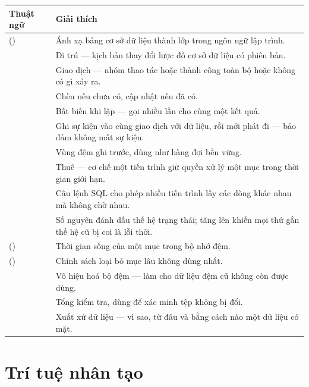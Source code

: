 \begin{longtable}{L{4.2cm} L{9.4cm}}
\toprule
\textbf{Thuật ngữ} & \textbf{Giải thích}\\
\midrule
\endhead
{} () & Ánh xạ bảng cơ sở dữ liệu thành lớp trong ngôn ngữ lập trình.\\
 & Di trú — kịch bản thay đổi lược đồ cơ sở dữ liệu có phiên bản.\\
 & Giao dịch — nhóm thao tác hoặc thành công toàn bộ hoặc không có gì xảy ra.\\
 & Chèn nếu chưa có, cập nhật nếu đã có.\\
 & Bất biến khi lặp — gọi nhiều lần cho cùng một kết quả.\\
 & Ghi sự kiện vào cùng giao dịch với dữ liệu, rồi mới phát đi — bảo đảm không mất sự kiện.\\
 & Vùng đệm ghi trước, dùng như hàng đợi bền vững.\\
 & Thuê — cơ chế một tiến trình giữ quyền xử lý một mục trong thời gian giới hạn.\\
 & Câu lệnh SQL cho phép nhiều tiến trình lấy các dòng khác nhau mà không chờ nhau.\\
 & Số nguyên đánh dấu thế hệ trạng thái; tăng lên khiến mọi thứ gắn thế hệ cũ bị coi là lỗi thời.\\
 () & Thời gian sống của một mục trong bộ nhớ đệm.\\
 () & Chính sách loại bỏ mục lâu không dùng nhất.\\
 & Vô hiệu hoá bộ đệm — làm cho dữ liệu đệm cũ không còn được dùng.\\
 & Tổng kiểm tra, dùng để xác minh tệp không bị đổi.\\
 & Xuất xứ dữ liệu — vì sao, từ đâu và bằng cách nào một dữ liệu có mặt.\\
\bottomrule
\end{longtable}

\section{Trí tuệ nhân tạo}

